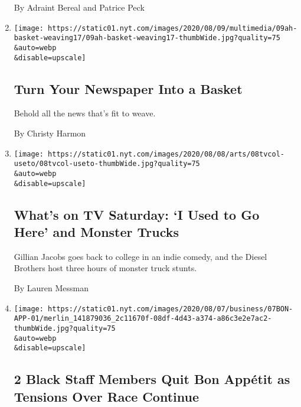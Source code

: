 \begin{enumerate}
  By Adraint Bereal and Patrice Peck
\item
  \href{/2020/08/08/at-home/coronavirus-newspaper-basket.html}{}

  \texttt{[image: https://static01.nyt.com/images/2020/08/09/multimedia/09ah-basket-weaving17/09ah-basket-weaving17-thumbWide.jpg?quality=75\\\&auto=webp\\\&disable=upscale]}

  \hypertarget{turn-your-newspaper-into-a-basket}{%
  \subsection{Turn Your Newspaper Into a
  Basket}\label{turn-your-newspaper-into-a-basket}}

  Behold all the news that's fit to weave.

  By Christy Harmon
\item
  \href{/2020/08/08/arts/television/whats-on-tv-saturday-i-used-to-go-here-and-monster-trucks.html}{}

  \texttt{[image: https://static01.nyt.com/images/2020/08/08/arts/08tvcol-useto/08tvcol-useto-thumbWide.jpg?quality=75\\\&auto=webp\\\&disable=upscale]}

  \hypertarget{whats-on-tv-saturday-i-used-to-go-here-and-monster-trucks}{%
  \subsection{What's on TV Saturday: `I Used to Go Here' and Monster
  Trucks}\label{whats-on-tv-saturday-i-used-to-go-here-and-monster-trucks}}

  Gillian Jacobs goes back to college in an indie comedy, and the Diesel
  Brothers host three hours of monster truck stunts.

  By Lauren Messman
\item
  \href{/2020/08/07/business/media/bon-appetit-race-black-staff-quits.html}{}

  \texttt{[image: https://static01.nyt.com/images/2020/08/07/business/07BON-APP-01/merlin\_141879036\_2c11670f-08df-4d43-a374-a86c3e2e7ac2-thumbWide.jpg?quality=75\\\&auto=webp\\\&disable=upscale]}

  \hypertarget{2-black-staff-members-quit-bon-appuxe9tit-as-tensions-over-race-continue}{%
  \subsection{2 Black Staff Members Quit Bon Appétit as Tensions Over
  Race
  Continue}\label{2-black-staff-members-quit-bon-appuxe9tit-as-tensions-over-race-continue}}


\end{enumerate}
